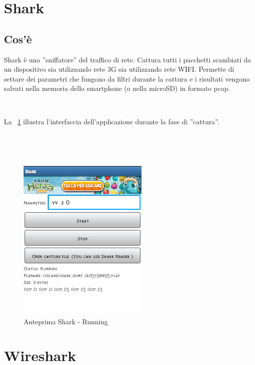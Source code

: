\documentclass[a4paper,11pt]{book}
\begin{document}
\clearpage

\section{Shark}
\subsection{Cos'\`e}

Shark \cite{rif5} \`e uno ''sniffatore'' del traffico di rete. Cattura tutti i pacchetti scambiati da un dispositivo sia utilizzando rete 3G sia utilizzando rete WIFI.
Permette di settare dei parametri che fungono da filtri durante la cattura e i risultati vengono salvati nella memoria dello smartphone (o nella microSD) in formato pcap.

~

La \figurename ~\ref{fig:go} illustra l'interfaccia dell'applicazione durante la fase di ''cattura''.

~


~

%
%
\begin{figure}[h!t]
\centering
\includegraphics[scale = 0.8]{shark_go}
\caption{Anteprima Shark - Running}
\label{fig:go}
\end{figure}

\clearpage

\section{Wireshark}
\end{document}
